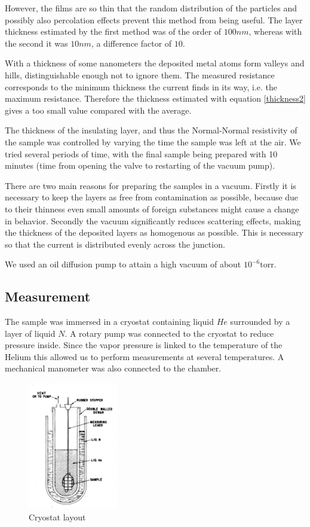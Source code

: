 However, the films are so thin that the random distribution of the particles and possibly also percolation effects prevent this method from being useful. The layer thickness estimated by the first method was of the order of $100nm$, whereas with the second it was $10nm$, a difference factor of $10$.

With a thickness of some nanometers the deposited metal atoms form valleys and hills, distinguishable enough not to ignore them. The measured resistance corresponds to the minimum thickness the current finds in its way, i.e. the maximum resistance. Therefore the thickness estimated with equation \eqref{thickness2} gives a too small value compared with the average.

The thickness of the insulating layer, and thus the Normal-Normal resistivity of the sample was controlled by varying the time the sample was left at the air. We tried several periods of time, with the final sample being prepared with 10 minutes (time from opening the valve to restarting of the vacuum pump).

There are two main reasons for preparing the samples in a vacuum. Firstly it is necessary to keep the layers as free from contamination as possible, because due to their thinness even small amounts of foreign substances might cause a change in behavior. Secondly the vacuum significantly reduces scattering effects, making the thickness of the deposited layers as homogenous as possible. This is necessary so that the current is distributed evenly across the junction.

We used an oil diffusion pump to attain a high vacuum of about $10^{-6}\text{torr}$.

\subsection{Measurement}
The sample was immersed in a cryostat containing liquid $He$ surrounded by a layer of liquid $N$. A rotary pump was connected to the cryostat to reduce pressure inside. Since the vapor pressure is linked to the temperature of the Helium this allowed us to perform measurements at several temperatures. A mechanical manometer was also connected to the chamber.

\begin{figure}
\centering
\includegraphics[width=0.35\textwidth]{cryostat.pdf}
\caption{Cryostat layout\label{cryostat}}
\end{figure}

